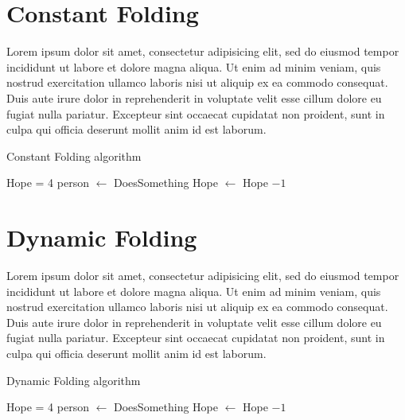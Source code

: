 \documentclass[11pt]{article}
\begin{document}
\section{Constant Folding}
Lorem ipsum dolor sit amet, consectetur adipisicing elit, sed do eiusmod tempor incididunt ut labore et dolore magna aliqua. Ut enim ad minim veniam, quis nostrud exercitation ullamco laboris nisi ut aliquip ex ea commodo consequat. Duis aute irure dolor in reprehenderit in voluptate velit esse cillum dolore eu fugiat nulla pariatur. Excepteur sint occaecat cupidatat non proident, sunt in culpa qui officia deserunt mollit anim id est laborum.
\begin{algorithm}[H]
\caption{Constant Folding algorithm}
\begin{algorithmic}[1]
  \State Hope = 4
  \State person $\gets$ DoesSomething
  \Else
  \State Hope $\gets$ Hope $-1$
  \EndIf
  \EndWhile
\end{algorithmic}
\end{algorithm}
\section{Dynamic Folding}
Lorem ipsum dolor sit amet, consectetur adipisicing elit, sed do eiusmod tempor incididunt ut labore et dolore magna aliqua. Ut enim ad minim veniam, quis nostrud exercitation ullamco laboris nisi ut aliquip ex ea commodo consequat. Duis aute irure dolor in reprehenderit in voluptate velit esse cillum dolore eu fugiat nulla pariatur. Excepteur sint occaecat cupidatat non proident, sunt in culpa qui officia deserunt mollit anim id est laborum.
\begin{algorithm}[H]
\caption{Dynamic Folding algorithm}
\begin{algorithmic}[1]
  \State Hope = 4
  \State person $\gets$ DoesSomething
  \Else
  \State Hope $\gets$ Hope $-1$
  \EndIf
  \EndWhile
\end{algorithmic}
\end{algorithm}
\end{document}

